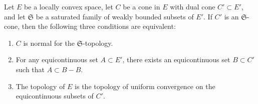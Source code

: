 Let $E$ be a locally convex space, let $C$ be a cone in $E$ with dual cone $C' \subset E'$, and let $\mathfrak{S}$ be a saturated family of weakly bounded subsets of $E'$. If $C'$ is an $\mathfrak{S}$-cone, then the following three conditions are equivalent:
\begin{enumerate}
\item[(a)] $C$ is normal for the $\mathfrak{S}$-topology.
\item[(b)] For any equicontinuous set $A \subset E'$, there exists an equicontinuous set $B \subset C'$ such that $A \subset B - B$.
\item[(c)] The topology of $E$ is the topology of uniform convergence on the equicontinuous subsets of $C'$.
\end{enumerate}
